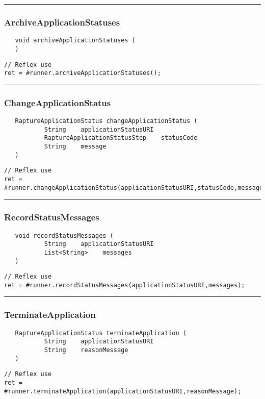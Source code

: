 \rule{15cm}{2pt}
\subsubsection{ArchiveApplicationStatuses}
\label{Api:ArchiveApplicationStatuses}
\begin{verbatim}
   void archiveApplicationStatuses (
   )
\end{verbatim}
\begin{lstlisting}[language=reflex]
// Reflex use
ret = #runner.archiveApplicationStatuses();
\end{lstlisting}



\rule{15cm}{2pt}
\subsubsection{ChangeApplicationStatus}
\label{Api:ChangeApplicationStatus}
\begin{verbatim}
   RaptureApplicationStatus changeApplicationStatus (
           String    applicationStatusURI
           RaptureApplicationStatusStep    statusCode
           String    message
   )
\end{verbatim}
\begin{lstlisting}[language=reflex]
// Reflex use
ret = #runner.changeApplicationStatus(applicationStatusURI,statusCode,message);
\end{lstlisting}



\rule{15cm}{2pt}
\subsubsection{RecordStatusMessages}
\label{Api:RecordStatusMessages}
\begin{verbatim}
   void recordStatusMessages (
           String    applicationStatusURI
           List<String>    messages
   )
\end{verbatim}
\begin{lstlisting}[language=reflex]
// Reflex use
ret = #runner.recordStatusMessages(applicationStatusURI,messages);
\end{lstlisting}



\rule{15cm}{2pt}
\subsubsection{TerminateApplication}
\label{Api:TerminateApplication}
\begin{verbatim}
   RaptureApplicationStatus terminateApplication (
           String    applicationStatusURI
           String    reasonMessage
   )
\end{verbatim}
\begin{lstlisting}[language=reflex]
// Reflex use
ret = #runner.terminateApplication(applicationStatusURI,reasonMessage);
\end{lstlisting}



